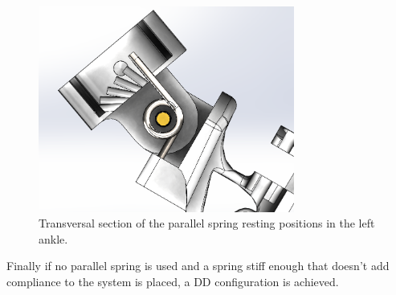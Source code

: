 \begin{figure}[ht!]
	\centering
	\includegraphics[width=0.75\textwidth]{figures/rotational_spring_rest_positions}
	\caption{Transversal section of the parallel spring resting positions in the left ankle.}
	\label{fig:rotational_spring_rest_position}
\end{figure}

Finally if no parallel spring is used and a spring stiff enough that doesn't add compliance to the system is placed, a DD configuration is achieved.
